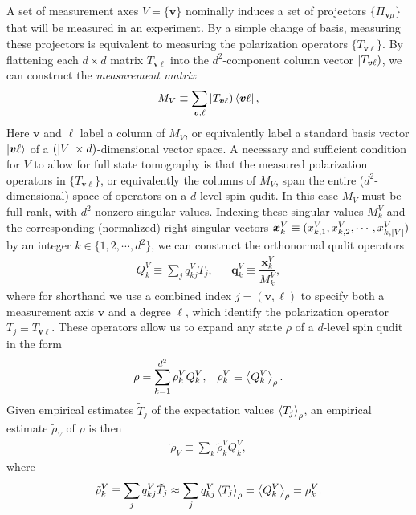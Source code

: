 \documentclass[notitlepage,twocolumn]{revtex4-2}
\newcommand{\f}[2]{\dfrac{#1}{#2}} %
\newcommand{\p}[1]{\left(#1\right)} %
\newcommand{\bk}{\Braket} %
\renewcommand{\v}{\bm} %
\renewcommand{\set}[1]{\{#1\}} %
\def\oket#1{\mathinner{|{#1})}}
\begin{document}
A set of measurement axes $V=\set{\v v}$ nominally induces a set of projectors $\set{\Pi_{\v v\mu}}$ that will be measured in an experiment.
By a simple change of basis, measuring these projectors is equivalent to measuring the polarization operators $\set{T_{\v v\ell}}$.
By flattening each $d\times d$ matrix $T_{\v v\ell}$ into the $d^2$-component column vector $\oket{T_{\v v\ell}}$, we can construct the {\it measurement matrix}
\begin{align}
  M_V \equiv \sum_{\v v,\ell} \oket{T_{\v v\ell}} \bra{\v v\ell},
  \label{eq:meas_mat}
\end{align}
Here $\v v$ and $\ell$ label a column of $M_V$, or equivalently label a standard basis vector $\ket{\v v\ell}$ of a $\p{\abs{V}\times d}$-dimensional vector space.
A necessary and sufficient condition for $V$ to allow for full state tomography is that the measured polarization operators in $\set{T_{\v v\ell}}$, or equivalently the columns of $M_V$, span the entire ($d^2$-dimensional) space of operators on a $d$-level spin qudit.
In this case $M_V$ must be full rank, with $d^2$ nonzero singular values.
Indexing these singular values $M^V_k$ and the corresponding (normalized) right singular vectors $\v x^V_k\equiv(x^V_{k,1},x^V_{k,2},\cdots,x^V_{k,\abs{V}})$ by an integer $k\in\set{1,2,\cdots,d^2}$, we can construct the orthonormal qudit operators
\begin{align}
  Q^V_k \equiv \sum_j q^V_{kj} T_j,
  &&
  \v q^V_k \equiv \f{\v x^V_k}{M^V_k},
\end{align}
where for shorthand we use a combined index $j=\p{\v v,\ell}$ to specify both a measurement axis $\v v$ and a degree $\ell$, which identify the polarization operator $T_j\equiv T_{\v v\ell}$.
These operators allow us to expand any state $\rho$ of a $d$-level spin qudit in the form
\begin{align}
  \rho = \sum_{k=1}^{d^2} \rho_k^V Q_k^V,
  &&
  \rho_k^V \equiv \bk{Q^V_k}_\rho.
\end{align}
Given empirical estimates $\tilde T_j$ of the expectation values $\bk{T_j}_\rho$, an empirical estimate $\tilde\rho_V$ of $\rho$ is then
\begin{align}
  \tilde\rho_V \equiv \sum_k \tilde\rho^V_k Q^V_k,
  \label{eq:reconstructed_state}
\end{align}
where
\begin{align}
  \tilde\rho^V_k \equiv \sum_j q^V_{kj} \tilde T_j
  \approx \sum_j q^V_{kj} \bk{T_j}_\rho
  = \bk{Q^V_k}_\rho
  = \rho^V_k.
\end{align}
\end{document}
